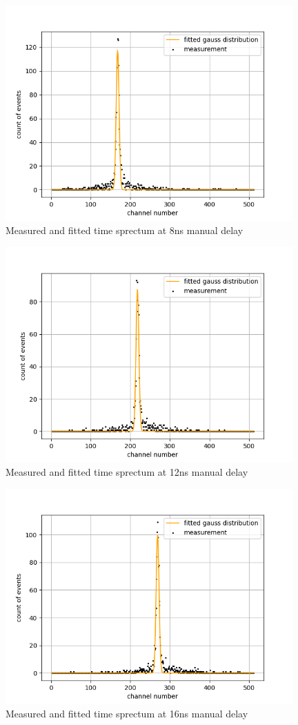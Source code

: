 \begin{figure}[H]
    \centering
    \includegraphics[width=110mm,scale=0.5]{Positronium/include/timecalibration2.png}
    \caption{Measured and fitted time sprectum at 8ns manual delay} 
    \label{fig:0nsnofit}
\end{figure}

\begin{figure}[H]
    \centering
    \includegraphics[width=110mm,scale=0.5]{Positronium/include/timecalibration3.png}
    \caption{Measured and fitted time sprectum at 12ns manual delay} 
    \label{fig:0nsnofit}
\end{figure}

\begin{figure}[H]
    \centering
    \includegraphics[width=110mm,scale=0.5]{Positronium/include/timecalibration4.png}
    \caption{Measured and fitted time sprectum at 16ns manual delay} 
    \label{fig:0nsnofit}
\end{figure}

